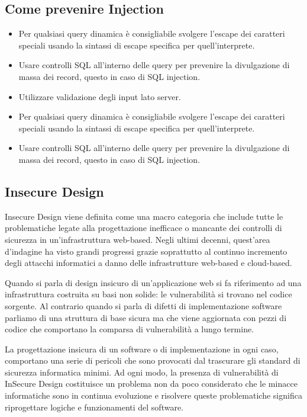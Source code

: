 \subsection{Come prevenire Injection} 
\begin{itemize}
    \item Per qualsiasi query dinamica è consigliabile svolgere l'escape dei caratteri speciali usando la sintassi di escape specifica per quell’interprete.
    \item Usare controlli SQL all’interno delle query per prevenire la divulgazione di massa dei record, questo in caso di SQL injection.
    \item Utilizzare validazione degli input lato server.
    \item Per qualsiasi query dinamica è consigliabile svolgere l'escape dei caratteri speciali usando la sintassi di escape specifica per quell’interprete.
    \item Usare controlli SQL all’interno delle query per prevenire la divulgazione di massa dei record, questo in caso di SQL injection.
\end{itemize}
\subsection{Insecure Design}
Insecure Design viene definita come una macro categoria che include tutte le problematiche legate alla progettazione inefficace o mancante dei controlli di sicurezza in un’infrastruttura web-based. Negli ultimi decenni, quest’area d’indagine ha visto grandi progressi grazie soprattutto al continuo incremento degli attacchi informatici a danno delle infrastrutture web-based e cloud-based.

Quando si parla di design insicuro di un’applicazione web si fa riferimento ad una infrastruttura costruita su basi non solide: le vulnerabilità si trovano nel codice sorgente. Al contrario quando si parla di difetti di implementazione software parliamo di una struttura di base sicura ma che viene aggiornata con pezzi di codice che comportano la comparsa di vulnerabilità a lungo termine. 

La progettazione insicura di un software o di implementazione in ogni caso, comportano una serie di pericoli che sono provocati dal trascurare gli standard di sicurezza informatica minimi. Ad ogni modo, la presenza di vulnerabilità di InSecure Design costituisce un problema non da poco considerato che le minacce informatiche sono in continua evoluzione e risolvere queste problematiche significa riprogettare logiche e funzionamenti del software.
